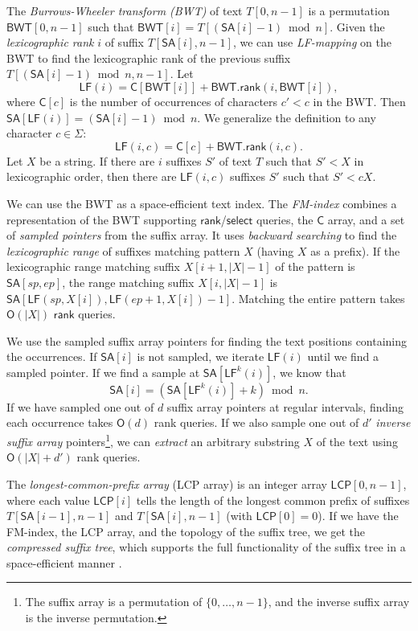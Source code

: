 \documentclass[twoside,leqno,twocolumn]{article}
\newcommand{\set}[1]{\ensuremath{\{ #1 \}}}
\newcommand{\abs}[1]{\ensuremath{\lvert #1 \rvert}}
\newcommand{\Oh}[1]{\ensuremath{\mathsf{O}\!\left( #1 \right)}}
\newcommand{\rank}{\ensuremath{\mathsf{rank}}}
\newcommand{\select}{\ensuremath{\mathsf{select}}}
\newcommand{\LF}{\ensuremath{\mathsf{LF}}}
\newcommand{\LFmapping}{LF\nobreakdash-mapping}
\newcommand{\FMindex}{FM\nobreakdash-index}
\newcommand{\SA}{\ensuremath{\mathsf{SA}}}
\newcommand{\BWT}{\ensuremath{\mathsf{BWT}}}
\newcommand{\Carray}{\ensuremath{\mathsf{C}}}
\newcommand{\LCP}{\ensuremath{\mathsf{LCP}}}
\begin{document}
The \emph{Burrows-Wheeler transform (BWT)} \cite{Burrows1994} of text $T[0, n-1]$ is a permutation $\BWT[0, n-1]$ such that $\BWT[i] = T[(\SA[i]-1) \bmod n]$. Given the \emph{lexicographic rank} $i$ of suffix $T[\SA[i], n-1]$, we can use \emph{\LFmapping} on the BWT to find the lexicographic rank of the previous suffix $T[(\SA[i]-1) \bmod n, n-1]$. Let
$$
\LF(i) = \Carray[\BWT[i]] + \BWT.\rank(i, \BWT[i]),
$$
where $\Carray[c]$ is the number of occurrences of characters $c' < c$ in the BWT. Then $\SA[\LF(i)] = (\SA[i]-1) \bmod n$. We generalize the definition to any character $c \in \Sigma$:
$$
\LF(i, c) = \Carray[c] + \BWT.\rank(i, c).
$$
Let $X$ be a string. If there are $i$ suffixes $S'$ of text $T$ such that $S' < X$ in lexicographic order, then there are $\LF(i, c)$ suffixes $S'$ such that $S' < cX$.

We can use the BWT as a space-efficient text index. The \emph{\FMindex} \cite{Ferragina2005a} combines a representation of the BWT supporting $\rank$/$\select$ queries, the $\Carray$ array, and a set of \emph{sampled pointers} from the suffix array. It uses \emph{backward searching} to find the \emph{lexicographic range} of suffixes matching pattern $X$ (having $X$ as a prefix). If the lexicographic range matching suffix $X[i+1, \abs{X}-1]$ of the pattern is $\SA[sp, ep]$, the range matching suffix $X[i, \abs{X}-1]$ is $\SA[\LF(sp, X[i]), \LF(ep+1, X[i]) - 1]$. Matching the entire pattern takes $\Oh{\abs{X}}$ $\rank$ queries.

We use the sampled suffix array pointers for finding the text positions containing the occurrences. If $\SA[i]$ is not sampled, we iterate $\LF(i)$ until we find a sampled pointer. If we find a sample at $\SA[\LF^{k}(i)]$, we know that
$$
\SA[i] = (\SA[\LF^{k}(i)] + k) \bmod n.
$$
If we have sampled one out of $d$ suffix array pointers at regular intervals, finding each occurrence takes $\Oh{d}$ rank queries. If we also sample one out of $d'$ \emph{inverse suffix array} pointers\footnote{The suffix array is a permutation of $\set{0, \dotsc, n-1}$, and the inverse suffix array is the inverse permutation.}, we can \emph{extract} an arbitrary substring $X$ of the text using $\Oh{\abs{X}+d'}$ rank queries.

The \emph{longest-common-prefix array} (LCP array) \cite{Manber1993} is an integer array $\LCP[0, n-1]$, where each value $\LCP[i]$ tells the length of the longest common prefix of suffixes $T[\SA[i-1], n-1]$ and $T[\SA[i], n-1]$ (with $\LCP[0] = 0$). If we have the \FMindex{}, the LCP array, and the topology of the suffix tree, we get the \emph{compressed suffix tree}, which supports the full functionality of the suffix tree in a space-efficient manner \cite{Sadakane2007}.
\end{document}
